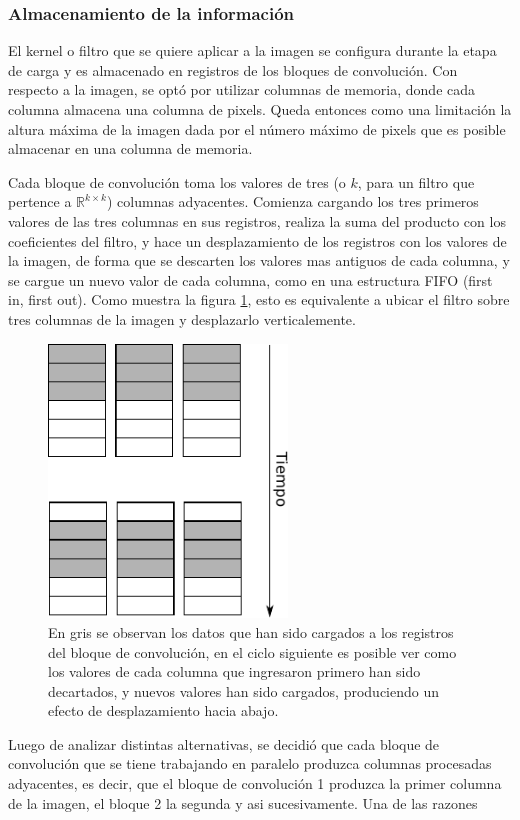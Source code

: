\documentclass[conference,compsoc]{IEEEtran}
\begin{document}
\subsubsection{Almacenamiento de la informaci\'on}
El kernel o filtro que se quiere aplicar a la imagen se configura durante la
etapa de carga y es almacenado en registros de los bloques de convoluci\'on. Con
respecto a la imagen, se opt\'o por utilizar columnas de memoria, donde cada
columna almacena una columna de pixels. Queda entonces como una limitaci\'on la
altura m\'axima de la imagen dada por el n\'umero m\'aximo de pixels que es
posible almacenar en una columna de memoria.

Cada bloque de convoluci\'on toma los valores de tres (o $k$, para un filtro que
pertence a $\mathbb{R}^{k{\times}k}$) columnas adyacentes.
Comienza cargando los tres primeros valores de las tres columnas en sus registros,
realiza la suma del producto con los coeficientes del filtro, y hace un
desplazamiento de los registros con los valores de la imagen, de forma que se
descarten los valores mas antiguos de cada columna, y se cargue un nuevo valor
de cada columna, como en una estructura FIFO (first in, first out). Como muestra
la figura \ref{proc_conv}, esto es equivalente a ubicar el filtro sobre tres
columnas de la imagen y desplazarlo verticalemente.
\begin{figure}[!t]
\centering
\includegraphics[width=2.5in]{proc_conv.pdf}
\caption{En gris se observan los datos que han sido cargados a los registros del
bloque de convoluci\'on, en el ciclo siguiente es posible ver como los valores
de cada columna que ingresaron primero han sido decartados, y nuevos valores han
sido cargados, produciendo un efecto de desplazamiento hacia abajo.}
\label{proc_conv}
\end{figure}

Luego de analizar distintas alternativas, se decidi\'o que cada bloque de
convoluci\'on que se tiene trabajando en paralelo produzca columnas procesadas
adyacentes, es decir, que el bloque de convoluci\'on 1 produzca la primer
columna de la imagen, el bloque 2 la segunda y asi sucesivamente. Una de las
razones 
\end{document}
